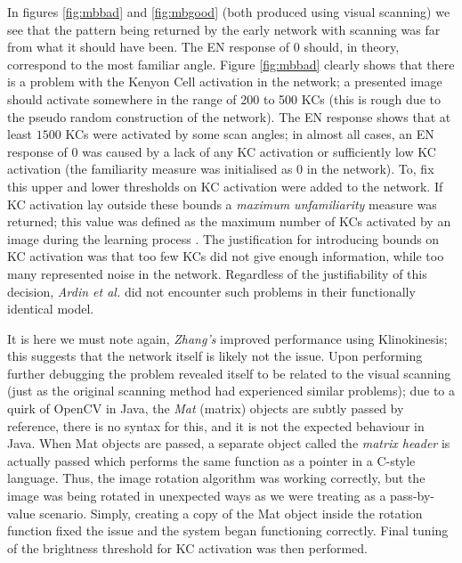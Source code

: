 \documentclass[a4paper,12pt,twoside,openright]{article}
\begin{document}
In figures \ref{fig:mbbad} and \ref{fig:mbgood} (both produced using visual scanning) we see that the pattern being
returned by the early network with scanning was far from what it should have been. The EN response of 0 should, in theory,
correspond to the most familiar angle. Figure \ref{fig:mbbad} clearly shows that there is a problem with the Kenyon Cell
activation in the network; a presented image should activate somewhere in the range of 200 to 500 KCs (this is rough due
to the pseudo random construction of the network). The EN response shows that at least $1500$ KCs were activated by some
scan angles; in almost all cases, an EN response of $0$ was caused by a lack of any KC activation or sufficiently
low KC activation (the familiarity measure
was initialised as $0$ in the network). To, fix this upper and lower thresholds on KC activation were added to the
network. If KC activation lay outside these bounds a \textit{maximum unfamiliarity} measure was returned; this value
was defined as the maximum number of KCs activated by an image during the learning process \cite{Zhang2017}. The justification for introducing
bounds on KC activation was that too few KCs did not give enough information, while too many represented noise in the network.
Regardless of the justifiability of this decision, \textit{Ardin et al.} did not encounter such problems in their functionally
identical model.
\newline

It is here we must note again, \textit{Zhang's} improved performance using Klinokinesis; this suggests that the network itself
is likely not the issue. Upon performing further debugging
the problem revealed itself to be related to the visual scanning (just as the original scanning method had experienced similar
problems); due to a quirk of OpenCV in Java, the \textit{Mat} (matrix) objects are subtly passed by reference, there is no
syntax for this, and it is not the expected behaviour in Java. When Mat objects are passed,
a separate object called the \textit{matrix header} is actually passed which performs the same function as a pointer in a C-style
language. Thus, the image rotation algorithm was working correctly, but the image was being rotated in unexpected ways as we were
treating as a pass-by-value scenario. Simply, creating a copy of the Mat object inside the rotation function fixed the issue
and the system began functioning correctly. Final tuning of the brightness threshold for KC activation was then performed.
\newline
\end{document}
